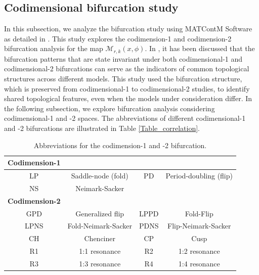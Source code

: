 \documentclass{article}
\begin{document}


\subsection{Codimensional bifurcation study} In this subsection, we analyze the bifurcation study using MATContM Software as detailed in \cite{kuznet2019numerical}. This study explores the codimension-1 and codimension-2 bifurcation analysis for the map $\mathcal{M}_{r,k}(x,\phi)$. In \cite{depannemaecker2026next}, it has been discussed that the bifurcation patterns that are state invariant under both codimensional-1 and codimensional-2 bifurcations can serve as the indicators of common topological structures across different models. This study used the bifurcation structure, which is preserved from codimensional-1 to codimensional-2 studies, to identify shared topological features, even when the models under consideration differ. In the following subsection, we explore bifurcation analysis considering codimensional-1 and -2 spaces. The abbreviations of different codimensional-1 and -2 bifurcations are illustrated in Table \ref{Table_correlation}.

\begin{table}[ht!]
\centering
\caption{Abbreviations for the codimension-1 and -2 bifurcation.}
\vline\begin{tabular}{||c||c||c||c||}
\hline
\textbf{Codimension-1}\\
\hline
LP & Saddle-node (fold) & PD & Period-doubling (flip) \\
 \hline
NS & Neimark-Sacker \\ 

\hline
\textbf{Codimension-2}
 
 \\
\hline
GPD & Generalized flip  & LPPD& Fold-Flip\\
LPNS& Fold-Neimark-Sacker & PDNS& Flip-Neimark-Sacker\\
CH & Chenciner  & CP& Cusp  \\ 
R1 & 1:1 resonance & R2 & 1:2 resonance \\
R3 & 1:3 resonance & R4 & 1:4 resonance \\ 
\hline 
\end{tabular}\vline\label{Table:3}
\end{table}
\end{document}
